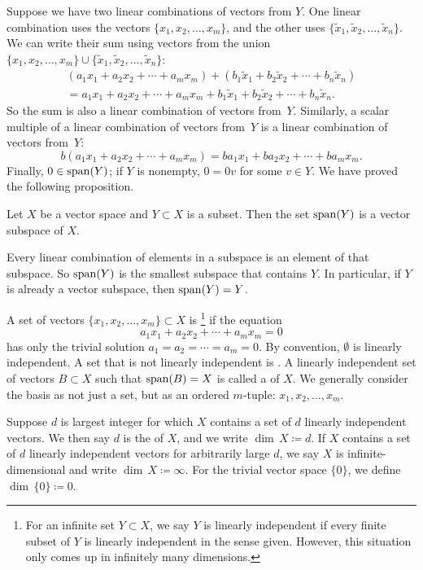 Suppose we have two linear combinations of vectors from $Y$.  One linear
combination uses the vectors $\{ x_1,x_2,\ldots,x_m \}$, and the other uses
$\{ \widetilde{x}_1,\widetilde{x}_2,\ldots,\widetilde{x}_n \}$.  We can write
their sum using vectors from the union
$\{ x_1,x_2,\ldots,x_m \} \cup
\{ \widetilde{x}_1,\widetilde{x}_2,\ldots,\widetilde{x}_n \}$:
\begin{multline*}
(a_1 x_1 + 
a_2 x_2 +  \cdots
+ a_m x_m)
+
(b_1 \widetilde{x}_1 + 
b_2 \widetilde{x}_2 +  \cdots
+ b_n \widetilde{x}_n)
\\
=
a_1 x_1 + 
a_2 x_2 +  \cdots
+ a_m x_m
+
b_1 \widetilde{x}_1 + 
b_2 \widetilde{x}_2 +  \cdots
+ b_n \widetilde{x}_n .
\end{multline*}
So the sum is also a linear combination of vectors from~$Y$.
Similarly,
a scalar multiple of a linear combination of vectors from~$Y$
is a linear combination of vectors from~$Y$:
\begin{equation*}
b (a_1 x_1 + 
a_2 x_2 +  \cdots
+ a_m x_m)
=
b a_1  x_1 + 
b a_2 x_2 +  \cdots
+ b a_m x_m .
\end{equation*}
Finally, $0 \in \operatorname{span}(Y)$; if $Y$ is nonempty, $0 = 0 v$ for some $v \in Y$.
We have proved the following proposition.

\begin{prop}
Let $X$ be a vector space and $Y \subset X$ is a subset.
Then the set $\operatorname{span}(Y)$ is a vector subspace of $X$.
\end{prop}

Every linear combination of elements in a subspace is an element of that
subspace.  So $\operatorname{span}(Y)$ is the smallest subspace that contains $Y$.
In particular,
if $Y$ is already a vector subspace, then $\operatorname{span}(Y) = Y$.

\begin{defn}
A set of vectors $\{ x_1, x_2, \ldots, x_m \} \subset X$ is 
\emph{}\footnote{%
For an infinite set $Y \subset X$, we say $Y$ is linearly
independent if every finite subset of $Y$ is linearly independent
in the sense given.
However, this situation only comes up in infinitely many dimensions.}
if the equation
\begin{equation} \label{eq:lincomb}
a_1 x_1 + a_2 x_2 + \cdots + a_m x_m = 0
\end{equation}
has only the trivial solution $a_1 = a_2 = \cdots = a_m = 0$.
By convention, $\emptyset$ is linearly independent.
A set that is not linearly independent is
\emph{}.
%
A linearly independent set of vectors $B \subset X$ such that
$\operatorname{span}(B) = X$ 
is called a \emph{} of $X$.
We generally consider the basis as not just a set, but as
an ordered $m$-tuple:
$x_1,x_2,\ldots,x_m$.

Suppose $d$ is largest integer for which $X$ contains a set of
$d$ linearly independent vectors.  We then say $d$ is
the \emph{} of $X$,
and we write $\dim \, X \coloneqq d$.
If $X$ contains a set of $d$ linearly independent vectors 
for arbitrarily large $d$, we say
$X$ is infinite-dimensional and write $\dim \, X \coloneqq \infty$.
%
For the trivial vector space $\{ 0 \}$, we define $\dim \, \{ 0 \} \coloneqq 0$.
\end{defn}

